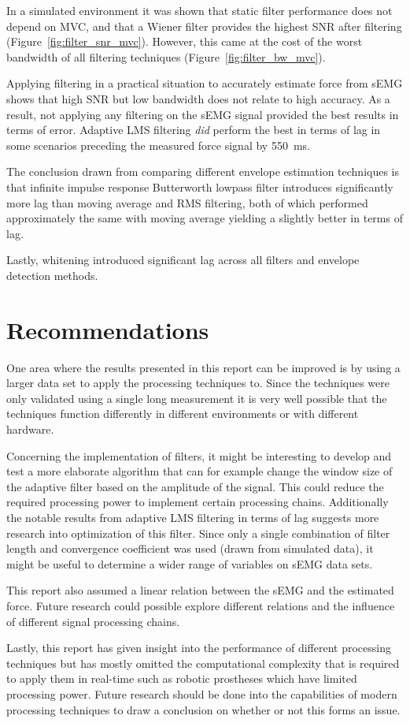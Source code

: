 In a simulated environment it was shown that static filter performance does not depend on MVC, and that a Wiener filter provides the highest SNR after filtering (Figure~\ref{fig:filter_snr_mvc}). However, this came at the cost of the worst bandwidth of all filtering techniques (Figure~\ref{fig:filter_bw_mvc}).

Applying filtering in a practical situation to accurately estimate force from sEMG shows that high SNR but low bandwidth does not relate to high accuracy. As a result, not applying any filtering on the sEMG signal provided the best results in terms of error. Adaptive LMS filtering \textit{did} perform the best in terms of lag in some scenarios preceding the measured force signal by \SI{550}{\milli\second}.

The conclusion drawn from comparing different envelope estimation techniques is that infinite impulse response Butterworth lowpass filter introduces significantly more lag than moving average and RMS filtering, both of which performed approximately the same with moving average yielding a slightly better in terms of lag.

Lastly, whitening introduced significant lag across all filters and envelope detection methods.

\section{Recommendations}
One area where the results presented in this report can be improved is by using a larger data set to apply the processing techniques to. Since the techniques were only validated using a single long measurement it is very well possible that the techniques function differently in different environments or with different hardware.

Concerning the implementation of filters, it might be interesting to develop and test a more elaborate algorithm that can for example change the window size of the adaptive filter based on the amplitude of the signal. This could reduce the required processing power to implement certain processing chains. Additionally the notable results from adaptive LMS filtering in terms of lag suggests more research into optimization of this filter. Since only a single combination of filter length and convergence coefficient was used (drawn from simulated data), it might be useful to determine a wider range of variables on sEMG data sets.

This report also assumed a linear relation between the sEMG and the estimated force. Future research could possible explore different relations and the influence of different signal processing chains.

Lastly, this report has given insight into the performance of different processing techniques but has mostly omitted the computational complexity that is required to apply them in real-time such as robotic prostheses \cite{semg_application_prosthesis} which have limited processing power. Future research should be done into the capabilities of modern processing techniques to draw a conclusion on whether or not this forms an issue.